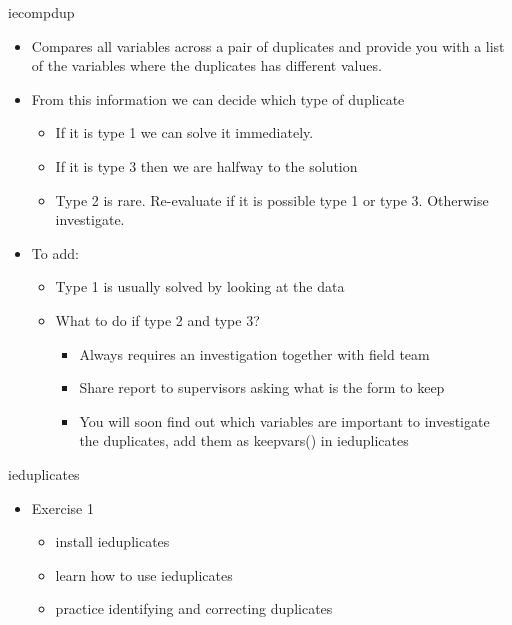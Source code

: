 \documentclass[aspectratio=169]{beamer}
\begin{document}
\begin{frame}{iecompdup}
\begin{itemize}
	\item Compares all variables across a pair of duplicates and provide you with a list of the variables where the duplicates has different values. 
	\item From this information we can decide which type of duplicate
	\begin{itemize}
		\item If it is type 1 we can solve it immediately. 
		\item If it is type 3 then we are halfway to the solution
		\item Type 2 is rare. Re-evaluate if it is possible type 1 or type 3. Otherwise investigate.
	\end{itemize}
\end{itemize}
\end{frame}

\begin{frame}{}
\begin{itemize}
	\item To add:
		\begin{itemize}
			\item Type 1 is usually solved by looking at the data
			\item What to do if type 2 and type 3?
				\begin{itemize}
					\item Always requires an investigation together with field team
					\item Share report to supervisors asking what is the form to keep 
					\item You will soon find out which variables are important to investigate the duplicates, add them as keepvars() in ieduplicates
				\end{itemize}
		\end{itemize}
\end{itemize}
\end{frame}

\begin{frame}{ieduplicates}
\begin{itemize}
	\item Exercise 1
	\begin{itemize}
		\item install ieduplicates
		\item learn how to use ieduplicates
		\item practice identifying and correcting duplicates
	\end{itemize}
\end{itemize}
\end{frame}
\end{document}

